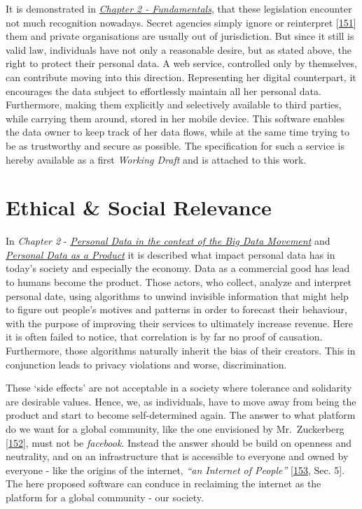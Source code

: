 \documentclass[12pt,english,a4paper,titlepage,cleardoublepage=empty,dottedtoc]{report}
\begin{document}
It is demonstrated in \emph{\protect\hyperlink{fundamentals}{Chapter 2 -
Fundamentals}}, that these legislation encounter not much recognition
nowadays. Secret agencies simply ignore or reinterpret
{[}\protect\hyperlink{ref-web_2016_bnd-weltraumtheorie}{151}{]} them and
private organisations are usually out of jurisdiction. But since it
still is valid law, individuals have not only a reasonable desire, but
as stated above, the right to protect their personal data. A web
service, controlled only by themselves, can contribute moving into this
direction. Representing her digital counterpart, it encourages the data
subject to effortlessly maintain all her personal data. Furthermore,
making them explicitly and selectively available to third parties, while
carrying them around, stored in her mobile device. This software enables
the data owner to keep track of her data flows, while at the same time
trying to be as trustworthy and secure as possible. The specification
for such a service is hereby available as a first \emph{Working Draft}
and is attached to this work.

\section{Ethical \& Social Relevance}\label{ethical-social-relevance}

In \emph{Chapter 2} -
\emph{\protect\hyperlink{personal-data-in-the-context-of-the-big-data-movement}{Personal
Data in the context of the Big Data Movement}} and
\emph{\protect\hyperlink{personal-data-as-a-product}{Personal Data as a
Product}} it is described what impact personal data has in today's
society and especially the economy. Data as a commercial good has lead
to humans become the product. Those actors, who collect, analyze and
interpret personal date, using algorithms to unwind invisible
information that might help to figure out people's motives and patterns
in order to forecast their behaviour, with the purpose of improving
their services to ultimately increase revenue. Here it is often failed
to notice, that correlation is by far no proof of causation.
Furthermore, those algorithms naturally inherit the bias of their
creators. This in conjunction leads to privacy violations and worse,
discrimination.

These `side effects' are not acceptable in a society where tolerance and
solidarity are desirable values. Hence, we, as individuals, have to move
away from being the product and start to become self-determined again.
The answer to what platform do we want for a global community, like the
one envisioned by Mr.~Zuckerberg
{[}\protect\hyperlink{ref-web_2017_facebook_building-global-community}{152}{]},
must not be \emph{facebook}. Instead the answer should be build on
openness and neutrality, and on an infrastructure that is accessible to
everyone and owned by everyone - like the origins of the internet,
\emph{``an Internet of People''}
{[}\protect\hyperlink{ref-web_2017_encouraging-individual-sovereignty}{153},
Sec. 5{]}. The here proposed software can conduce in reclaiming the
internet as the platform for a global community - our society.
\end{document}
